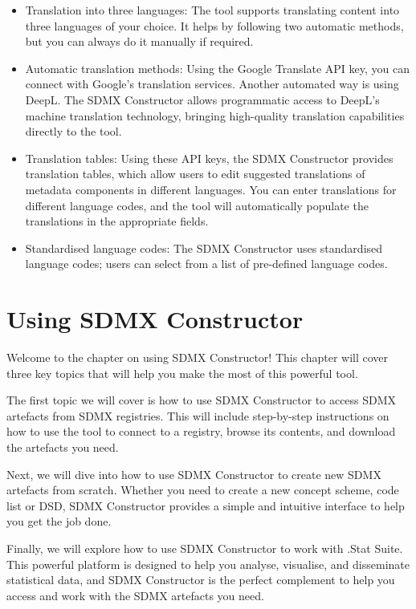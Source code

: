 \documentclass[
]{book}
\providecommand{\tightlist}{%
  \setlength{\itemsep}{0pt}\setlength{\parskip}{0pt}}
\begin{document}
\begin{itemize}
\tightlist
\item
  Translation into three languages: The tool supports translating content into three languages of your choice. It helps by following two automatic methods, but you can always do it manually if required.
\item
  Automatic translation methods: Using the Google Translate API key, you can connect with Google's translation services. Another automated way is using DeepL. The SDMX Constructor allows programmatic access to DeepL's machine translation technology, bringing high-quality translation capabilities directly to the tool.
\item
  Translation tables: Using these API keys, the SDMX Constructor provides translation tables, which allow users to edit suggested translations of metadata components in different languages. You can enter translations for different language codes, and the tool will automatically populate the translations in the appropriate fields.
\item
  Standardised language codes: The SDMX Constructor uses standardised language codes; users can select from a list of pre-defined language codes.
\end{itemize}

\hypertarget{using-sdmx}{%
\chapter{Using SDMX Constructor}\label{using-sdmx}}

Welcome to the chapter on using SDMX Constructor! This chapter will cover three key topics that will help you make the most of this powerful tool.

The first topic we will cover is how to use SDMX Constructor to access SDMX artefacts from SDMX registries. This will include step-by-step instructions on how to use the tool to connect to a registry, browse its contents, and download the artefacts you need.

Next, we will dive into how to use SDMX Constructor to create new SDMX artefacts from scratch. Whether you need to create a new concept scheme, code list or DSD, SDMX Constructor provides a simple and intuitive interface to help you get the job done.

Finally, we will explore how to use SDMX Constructor to work with .Stat Suite. This powerful platform is designed to help you analyse, visualise, and disseminate statistical data, and SDMX Constructor is the perfect complement to help you access and work with the SDMX artefacts you need.
\end{document}
